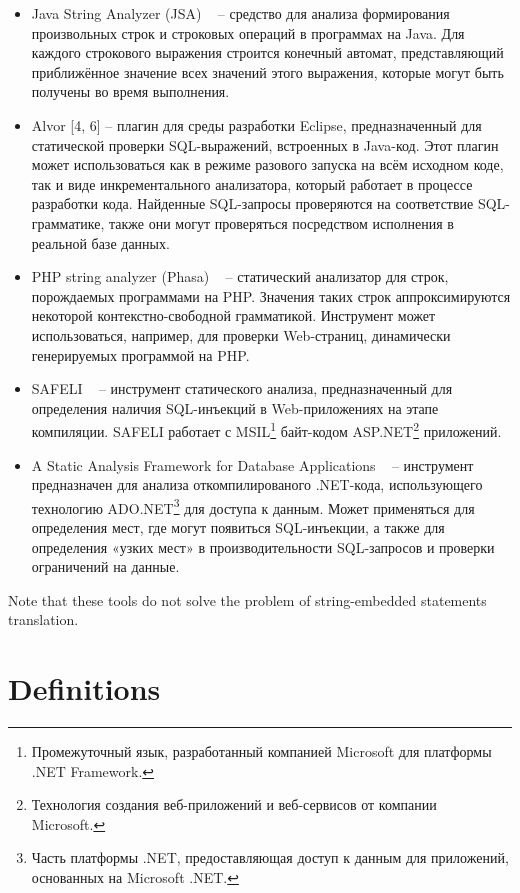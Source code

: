 \documentclass{llncs}
\begin{document}
\begin{itemize}
    \item Java String Analyzer (JSA) ~\cite{JSA} -- средство для анализа формирования произвольных строк и строковых операций в программах на Java. Для каждого строкового выражения строится конечный автомат, представляющий приближённое значение всех значений этого выражения, которые могут быть получены во время выполнения.
    \item Alvor [4, 6] -- плагин для среды разработки Eclipse, предназначенный для статической проверки SQL-выражений, встроенных в Java-код. Этот плагин может использоваться как в режиме разового запуска на всём исходном коде, так и виде инкрементального анализатора, который работает в процессе разработки кода. Найденные SQL-запросы проверяются на соответствие SQL-грамматике, также они могут проверяться посредством исполнения в реальной базе данных.
    \item PHP string analyzer (Phasa) ~\cite{PHPSA} -- статический анализатор для строк, порождаемых программами на PHP. Значения таких строк аппроксимируются некоторой контекстно-свободной грамматикой. Инструмент может  использоваться, например,  для проверки Web-страниц, динамически генерируемых программой на  PHP.
    \item SAFELI ~\cite{SAForInject} -- инструмент статического анализа, предназначенный для определения наличия SQL-инъекций в Web-приложениях на этапе компиляции. SAFELI работает с MSIL\footnote{Промежуточный язык, разработанный компанией Microsoft для платформы .NET Framework.} байт-кодом ASP.NET\footnote{Технология создания веб-приложений и веб-сервисов от компании Microsoft.} приложений.
    \item A Static Analysis Framework for Database Applications ~\cite{StringExpr} -- инструмент предназначен для анализа откомпилированого .NET-кода, использующего технологию ADO.NET\footnote{ Часть платформы .NET, предоставляющая доступ к данным для приложений, основанных на Microsoft .NET.} для доступа к данным. Может применяться для определения мест, где могут появиться SQL-инъекции, а также для определения «узких мест» в производительности SQL-запросов и проверки ограничений на данные.
\end{itemize}

Note that these tools do not solve the problem of string-embedded statements translation.

\section{Definitions}
\end{document}
